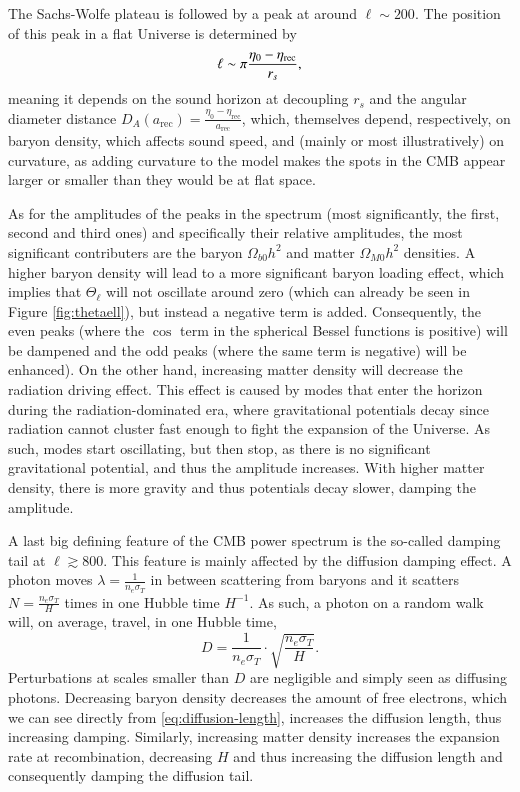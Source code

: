\documentclass{aa}
\begin{document}
The Sachs-Wolfe plateau is followed by a peak at around $\ell\sim 200$. The position of this peak in a flat Universe is determined by
\begin{equation}
\ell \sim \pi \frac{\eta_0 - \eta_{\rm rec}}{r_s},
\end{equation}
meaning it depends on the sound horizon at decoupling $r_s$ and the angular diameter distance $D_A(a_\text{rec}) = \frac{\eta_0-\eta_\text{rec}}{a_\text{rec}}$, which, themselves depend, respectively, on baryon density, which affects sound speed, and (mainly or most illustratively) on curvature, as adding curvature to the model makes the spots in the CMB appear larger or smaller than they would be at flat space.

As for the amplitudes of the peaks in the spectrum (most significantly, the first, second and third ones) and specifically their relative amplitudes, the most significant contributers are the baryon $\Omega_{b0}h^2$ and matter $\Omega_{M0}h^2$ densities. A higher baryon density will lead to a more significant baryon loading effect, which implies that $\Theta_\ell$ will not oscillate around zero (which can already be seen in Figure \ref{fig:thetaell}), but instead a negative term is added. Consequently, the even peaks (where the $\cos$ term in the spherical Bessel functions is positive) will be dampened and the odd peaks (where the same term is negative) will be enhanced). On the other hand, increasing matter density will decrease the radiation driving effect. This effect is caused by modes that enter the horizon during the radiation-dominated era, where gravitational potentials decay since radiation cannot cluster fast enough to fight the expansion of the Universe. As such, modes start oscillating, but then stop, as there is no significant gravitational potential, and thus the amplitude increases. With higher matter density, there is more gravity and thus potentials decay slower, damping the amplitude.

A last big defining feature of the CMB power spectrum is the so-called damping tail at $\ell\gtrsim800$. This feature is mainly affected by the diffusion damping effect. A photon moves $\lambda = \frac{1}{n_e\sigma_T}$ in between scattering from baryons and it scatters $N = \frac{n_e\sigma_T}{H}$ times in one Hubble time $H^{-1}$. As such, a photon on a random walk will, on average, travel, in one Hubble time,
\begin{equation} \label{eq:diffusion-length}
D = \frac{1}{n_e\sigma_T} \cdot \sqrt{\frac{n_e\sigma_T}{H}}.
\end{equation}
Perturbations at scales smaller than $D$ are negligible and simply seen as diffusing photons. Decreasing baryon density decreases the amount of free electrons, which we can see directly from \eqref{eq:diffusion-length}, increases the diffusion length, thus increasing damping. Similarly, increasing matter density increases the expansion rate at recombination, decreasing $H$ and thus increasing the diffusion length and consequently damping the diffusion tail.
\end{document}
